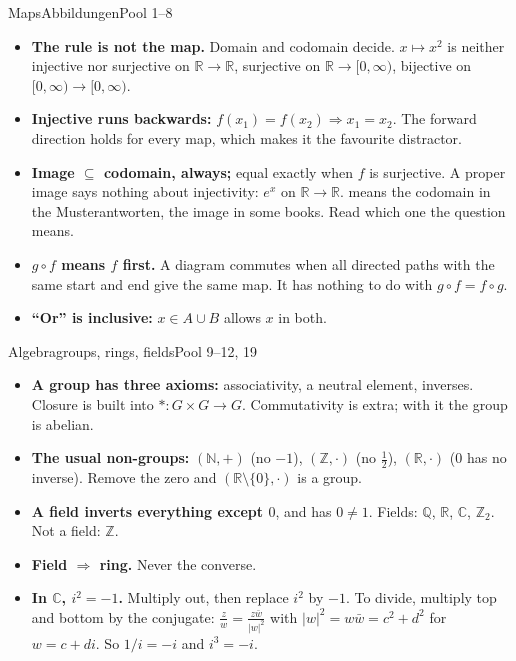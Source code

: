 \documentclass{kaelearn}
\begin{document}
\begin{panel}[unbreakable]{Maps}{Abbildungen}{Pool 1--8}
\begin{itemize}
  \item \textbf{The rule is not the map.} Domain and codomain decide. $x\mapsto x^2$ is neither
        injective nor surjective on $\mathbb R\to\mathbb R$, surjective on $\mathbb R\to[0,\infty)$,
        bijective on $[0,\infty)\to[0,\infty)$.
  \item \textbf{Injective runs backwards:} $f(x_1)=f(x_2)\Rightarrow x_1=x_2$. The forward
        direction holds for every map, which makes it the favourite distractor.
  \item \textbf{Image $\subseteq$ codomain, always;} equal exactly when $f$ is surjective. A proper
        image says nothing about injectivity: $e^x$ on $\mathbb R\to\mathbb R$.
         means the codomain in the Musterantworten, the image in some books. Read
        which one the question means.
  \item \textbf{$g\circ f$ means $f$ first.} A diagram commutes when all directed paths with the
        same start and end give the same map. It has nothing to do with $g\circ f=f\circ g$.
  \item \textbf{``Or'' is inclusive:} $x\in A\cup B$ allows $x$ in both.
\end{itemize}
\end{panel}

\begin{panel}[unbreakable]{Algebra}{groups, rings, fields}{Pool 9--12, 19}
\begin{itemize}
  \item \textbf{A group has three axioms:} associativity, a neutral element, inverses. Closure is
        built into $*\colon G\times G\to G$. Commutativity is extra; with it the group is abelian.
  \item \textbf{The usual non-groups:} $(\mathbb N,+)$ (no $-1$), $(\mathbb Z,\cdot)$ (no
        $\tfrac12$), $(\mathbb R,\cdot)$ ($0$ has no inverse). Remove the zero and
        $(\mathbb R\setminus\{0\},\cdot)$ is a group.
  \item \textbf{A field inverts everything except $0$}, and has $0\neq1$. Fields: $\mathbb Q$,
        $\mathbb R$, $\mathbb C$, $\mathbb Z_2$. Not a field: $\mathbb Z$.
  \item \textbf{Field $\Rightarrow$ ring.} Never the converse.
  \item \textbf{In $\mathbb C$, $i^2=-1$.} Multiply out, then replace $i^2$ by $-1$. To divide,
        multiply top and bottom by the conjugate: $\frac zw=\frac{z\bar w}{|w|^2}$ with
        $|w|^2=w\bar w=c^2+d^2$ for $w=c+di$. So $1/i=-i$ and $i^3=-i$.
\end{itemize}
\end{panel}
\end{document}
